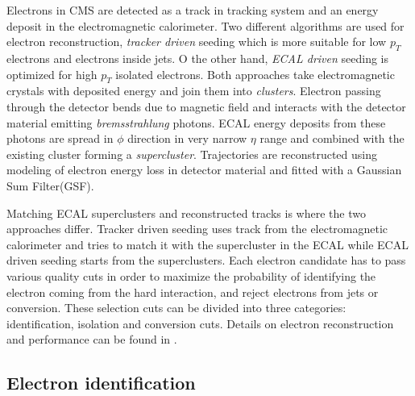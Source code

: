 Electrons in CMS are detected as a track in tracking system and an energy deposit in the electromagnetic calorimeter. Two different algorithms are used for electron reconstruction, \textit{tracker driven} seeding which is more suitable for low $p_T$ electrons and electrons inside jets. O the other hand, \textit{ECAL driven} seeding is optimized for high $p_T$ isolated electrons. Both approaches take electromagnetic crystals with deposited energy and join them into \textit{clusters}. Electron passing through the detector bends due to magnetic field and interacts with the detector material emitting \textit{bremsstrahlung} photons. ECAL energy deposits from these photons are spread in $\phi$ direction in very narrow $\eta$ range and combined with the existing cluster forming a \textit{supercluster}. Trajectories are reconstructed using modeling of electron energy loss in detector material and fitted with a Gaussian Sum Filter(GSF)\cite{2005JPhG31N9A}.
\par Matching ECAL superclusters and reconstructed tracks is where the two approaches differ. Tracker driven seeding uses track from the electromagnetic calorimeter and tries to match it with the supercluster in the ECAL while ECAL driven seeding starts from the superclusters.
Each electron candidate has to pass various quality cuts in order to maximize the probability of identifying the electron coming from the hard interaction, and reject electrons from jets or conversion. These selection cuts can be divided into three categories: identification, isolation and conversion cuts. Details on electron reconstruction and performance can be found in \cite{CMS:2010bta}.

\subsection{Electron identification}
\label{sec:eleID}

